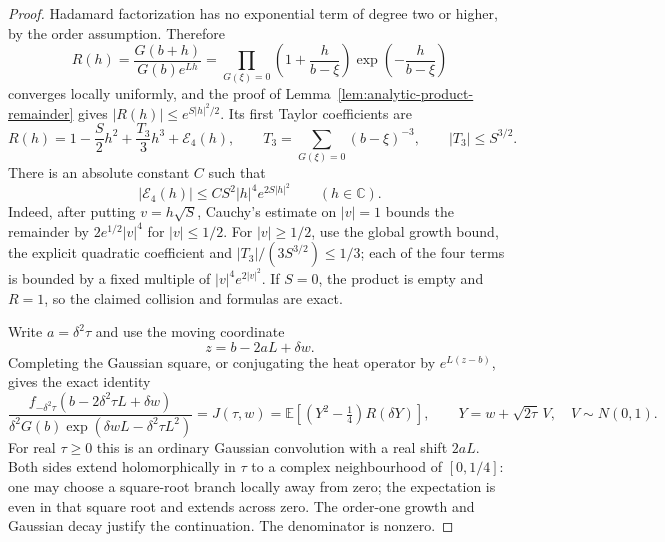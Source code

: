 \begin{proof}
Hadamard factorization has no exponential term of degree two
or higher, by the order assumption. Therefore
\[
 R(h)=\frac{G(b+h)}{G(b)e^{Lh}}
       =\prod_{G(\xi)=0}
         \left(1+\frac h{b-\xi}\right)
                           \exp\left(-\frac h{b-\xi}\right)
\]
converges locally uniformly, and the proof of
Lemma~\ref{lem:analytic-product-remainder} gives
$|R(h)|\le e^{S|h|^2/2}$. Its first Taylor coefficients are
\begin{equation}\label{eq:analytic-pair-R-expansion}
 R(h)=1-\frac S2h^2+\frac{T_3}{3}h^3+\mathcal E_4(h),
          \qquad T_3=\sum_{G(\xi)=0}(b-\xi)^{-3},
          \qquad |T_3|\le S^{3/2}.
\end{equation}
There is an absolute constant $C$ such that
\begin{equation}\label{eq:analytic-pair-R-fourth}
 |\mathcal E_4(h)|\le
               CS^2|h|^4e^{2S|h|^2}\qquad(h\in\mathbb C).
\end{equation}
Indeed, after putting $v=h\sqrt S$, Cauchy's estimate on
$|v|=1$ bounds the remainder by $2e^{1/2}|v|^4$ for
$|v|\le1/2$. For $|v|\ge1/2$, use the global growth bound,
the explicit quadratic coefficient and
$|T_3|/(3S^{3/2})\le1/3$; each of the four terms is bounded
by a fixed multiple of $|v|^4e^{2|v|^2}$.
If $S=0$, the product is empty and $R=1$, so the claimed
collision and formulas are exact.

Write $a=\delta^2\tau$ and use the moving coordinate
\[
                         z=b-2aL+\delta w.
\]
Completing the Gaussian square, or conjugating the heat
operator by $e^{L(z-b)}$, gives the exact identity
\begin{equation}\label{eq:analytic-pair-scaled-family}
 \frac{f_{-\delta^2\tau}(b-2\delta^2\tau L+\delta w)}
      {\delta^2G(b)\exp(\delta wL-\delta^2\tau L^2)}
  =J(\tau,w)
  =\mathbb E\left[(Y^2-\tfrac14)R(\delta Y)\right],
                \qquad Y=w+\sqrt{2\tau}\,V,\quad V\sim N(0,1).
\end{equation}
For real $\tau\ge0$ this is an ordinary Gaussian convolution
with a real shift $2aL$. Both sides extend holomorphically
in $\tau$ to a complex neighbourhood of $[0,1/4]$:
one may choose a square-root branch locally away from zero;
the expectation is even in that square root and extends
across zero. The order-one growth and Gaussian decay
justify the continuation. The denominator is nonzero.


\end{proof}
